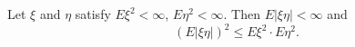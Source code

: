 Let $\xi$ and $\eta$ satisfy $E\xi^2 < \infty$, $E\eta^2 < \infty$. Then $E|\xi\eta| < \infty$ and
$$(E|\xi\eta|)^2 \leq E\xi^2 \cdot E\eta^2.$$
